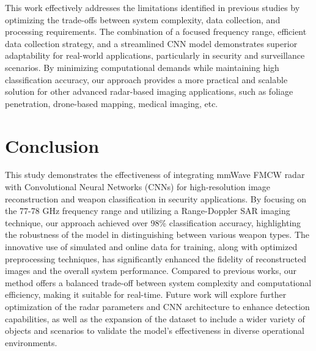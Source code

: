 \documentclass[journal,article,submit,pdftex,moreauthors]{Definitions/mdpi}
\begin{document}
This work effectively addresses the limitations identified in previous studies by optimizing the trade-offs between system complexity, data collection, and processing requirements. The combination of a focused frequency range, efficient data collection strategy, and a streamlined CNN model demonstrates superior adaptability for real-world applications, particularly in security and surveillance scenarios. By minimizing computational demands while maintaining high classification accuracy, our approach provides a more practical and scalable solution for other advanced radar-based imaging applications, such as foliage penetration, drone-based mapping, medical imaging, etc.


\section{Conclusion}
This study demonstrates the effectiveness of integrating mmWave FMCW radar with Convolutional Neural Networks (CNNs) for high-resolution image reconstruction and weapon classification in security applications. By focusing on the 77-78 GHz frequency range and utilizing a Range-Doppler SAR imaging technique, our approach achieved over 98\% classification accuracy, highlighting the robustness of the model in distinguishing between various weapon types. The innovative use of simulated and online data for training, along with optimized preprocessing techniques, has significantly enhanced the fidelity of reconstructed images and the overall system performance. Compared to previous works, our method offers a balanced trade-off between system complexity and computational efficiency, making it suitable for real-time. Future work will explore further optimization of the radar parameters and CNN architecture to enhance detection capabilities, as well as the expansion of the dataset to include a wider variety of objects and scenarios to validate the model's effectiveness in diverse operational environments.

\end{document}
